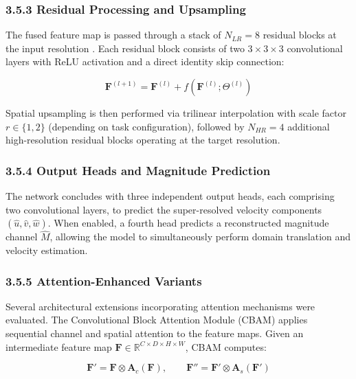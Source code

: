 \documentclass[11pt]{article}
\begin{document}
\subsubsection*{3.5.3 Residual Processing and Upsampling}

The fused feature map is passed through a stack of $N_{LR} = 8$ residual blocks at the input resolution \cite{he2016resnet}. Each residual block consists of two $3\times3\times3$ convolutional layers with ReLU activation and a direct identity skip connection:

\begin{equation}
    \mathbf{F}^{(l+1)} = \mathbf{F}^{(l)} + f\left(\mathbf{F}^{(l)}; \Theta^{(l)}\right)
\end{equation}

Spatial upsampling is then performed via trilinear interpolation with scale factor $r \in \{1, 2\}$ (depending on task configuration), followed by $N_{HR} = 4$ additional high-resolution residual blocks operating at the target resolution.

\subsubsection*{3.5.4 Output Heads and Magnitude Prediction}

The network concludes with three independent output heads, each comprising two convolutional layers, to predict the super-resolved velocity components $(\hat{u}, \hat{v}, \hat{w})$. When enabled, a fourth head predicts a reconstructed magnitude channel $\hat{M}$, allowing the model to simultaneously perform domain translation and velocity estimation.

\subsubsection*{3.5.5 Attention-Enhanced Variants}

Several architectural extensions incorporating attention mechanisms were evaluated. The Convolutional Block Attention Module (CBAM) \cite{woo2018cbam} applies sequential channel and spatial attention to the feature maps. Given an intermediate feature map $\mathbf{F} \in \mathbb{R}^{C \times D \times H \times W}$, CBAM computes:

\begin{equation}
    \mathbf{F}' = \mathbf{F} \otimes \mathbf{A}_c(\mathbf{F}), \qquad
    \mathbf{F}'' = \mathbf{F}' \otimes \mathbf{A}_s(\mathbf{F}')
\end{equation}
\end{document}
